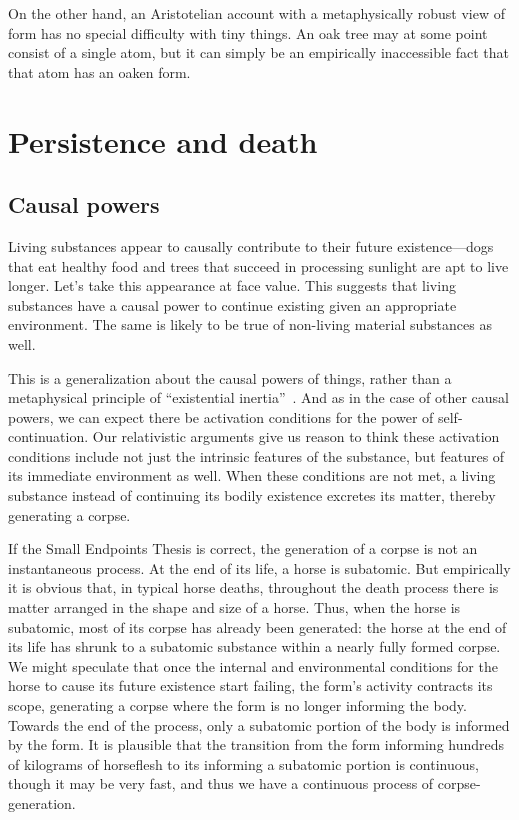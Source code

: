 On the other hand, an Aristotelian account with a metaphysically robust view of form has no special difficulty with 
tiny things. An oak tree may at some point consist of a single atom, but it can simply be an empirically inaccessible 
fact that that atom has an oaken form. 

\section{Persistence and death}
\subsection{Causal powers}
Living substances appear to causally contribute to their future existence---dogs that eat healthy food and trees that succeed
in processing sunlight are apt to live longer. Let's take this appearance at face value. This suggests that living substances
have a causal power to continue existing given an appropriate environment. The same is likely to be true of non-living material
substances as well. 

This is a generalization about the causal powers of things, rather than a metaphysical principle of ``existential inertia''~\parencite{SchmidInertia}.
And as in the case of other causal powers, we can expect there be activation conditions for the power of self-continuation.
Our relativistic arguments give us reason to think these activation conditions include not just the intrinsic features 
of the substance, but features of its immediate environment as well. When these conditions are not met, a living 
substance instead of continuing its bodily existence excretes its matter, thereby generating a corpse. 

If the Small Endpoints Thesis is correct, the generation of a corpse is not an instantaneous process. At the end of its 
life, a horse is subatomic. But empirically it is obvious that, in typical horse deaths, throughout the death process there 
is matter arranged in the shape and size of a horse. Thus, when the horse is subatomic, most of its corpse has already been
generated: the horse at the end of its life has shrunk to a subatomic substance within a nearly fully formed corpse. We might speculate
that once the internal and environmental conditions for the horse to cause its future existence start failing, the form's 
activity contracts its scope, generating a corpse where the form is no longer informing the body. Towards the end
of the process, only a subatomic portion of the body is informed by the form. It is plausible that the transition from 
the form informing hundreds of kilograms of horseflesh to its informing a subatomic portion is continuous, though it may be 
very fast, and thus we have a continuous process of corpse-generation. 

